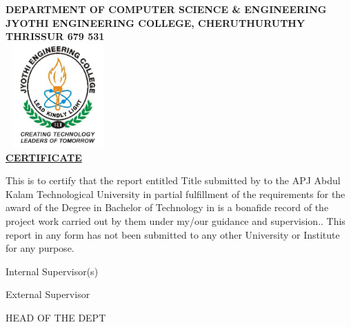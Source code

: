 

\begin{water}  %
\linespread{1}
 \begin{center}
	\textbf{\fontsize{14}{28}\selectfont  DEPARTMENT OF COMPUTER SCIENCE \& ENGINEERING}\\[0.4cm]
	\textbf{\fontsize{14}{28}\selectfont JYOTHI ENGINEERING COLLEGE, CHERUTHURUTHY}\\[0.4cm]
	\textbf{THRISSUR  679 531}\\[1cm]
\includegraphics[height=4cm, width=4cm]{fig/logo1.jpg}\\[0.5cm]
\vspace{1cm}
\underline{\textbf{\fontsize{14}{28}\selectfont CERTIFICATE}}
\end{center}
\vspace{1cm}
\fontsize{12}{28}\selectfont

This is to certify that the report entitled Title \textbf{\fontsize{14}{28}\selectfont{Project Title}} submitted by \textbf{\fontsize{12}{28}\selectfont { Student Names}} to the APJ Abdul Kalam Technological University in partial fulfillment of the requirements for the award of the Degree in   Bachelor  of Technology in \textbf{\fontsize{12}{28}\selectfont { Computer Science \& Engineering}} is a bonafide record of the project work carried out by them  under my/our guidance and supervision.. This report in any form has not been submitted to any other University or Institute for any purpose. 

\vspace{2.5cm}




\begin{flushleft}
\begin{minipage}{.3\textwidth}
\begin{center}
Internal Supervisor(s)
\end{center}
\end{minipage}
\hfill
\begin{minipage}[c]{.3\textwidth}
\begin{center}
External Supervisor
\end{center}
\end{minipage}
\hfill
\begin{minipage}[r]{.3\textwidth}
\begin{center}
HEAD OF THE DEPT
\end{center}
\end{minipage}
\end{flushleft}
\end{water}
\thispagestyle{empty}








